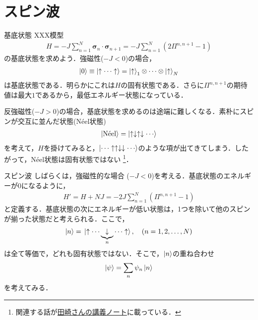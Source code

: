 \documentclass[../main.tex]{subfiles}
\begin{document}
\section{スピン波}

\begin{frame}{基底状態}
    XXX模型
    \begin{align}
        H = -J\sum_{n=1}^N \bm{\sigma}_n\cdot \bm{\sigma}_{n+1} = -J \sum_{n=1}^N (2\Pi^{n,n+1}-1)
    \end{align}
    の基底状態を求めよう．強磁性($-J < 0$)の場合，
    \begin{align}
        \ket{0} \equiv \ket{\uparrow \cdots \uparrow} = \ket{\uparrow}_1 \otimes \cdots \otimes \ket{\uparrow}_N
    \end{align}
    は基底状態である．明らかにこれは$H$の固有状態である．さらに$\Pi^{n,n+1}$の期待値は最大$1$であるから，最低エネルギー状態になっている．
    
    反強磁性($-J > 0$)の場合，基底状態を求めるのは途端に難しくなる．素朴にスピンが交互に並んだ状態(N\'eel状態)
    \begin{align}
        \ket{\textrm{N\'{e}el}} = \ket{\uparrow\downarrow\uparrow\downarrow \cdots}
    \end{align}
    を考えて，$H$を掛けてみると，$\ket{\cdots \uparrow\uparrow\downarrow\downarrow \cdots}$のような項が出てきてしまう．したがって，N\'eel状態は固有状態ではない
    \footnote{
        関連する話が\href{https://repository.kulib.kyoto-u.ac.jp/dspace/bitstream/2433/94910/1/KJ00004789857.pdf}{田崎さんの講義ノート}に載っている．
    }．
\end{frame} 

\begin{frame}{スピン波}
    しばらくは，強磁性的な場合 ($-J<0$)を考える．基底状態のエネルギーが$0$になるように，
    \begin{align}
        H' = H + NJ = -2J \sum_{n=1}^N (\Pi^{n,n+1}-1)
    \end{align}
    と定義する．基底状態の次にエネルギーが低い状態は，1つを除いて他のスピンが揃った状態だと考えられる．ここで，
    \begin{align}
        \ket{n} = \ket*{\uparrow \cdots \underbrace{\downarrow}_n\cdots\uparrow},
        \quad (n=1,2,\ldots,N)
    \end{align}
    は全て等価で，どれも固有状態ではない．そこで，$\ket{n}$の重ね合わせ
    \begin{align}
        \ket{\psi} = \sum_n \psi_n \ket{n}
    \end{align}
    を考えてみる．
\end{frame}
\end{document}
